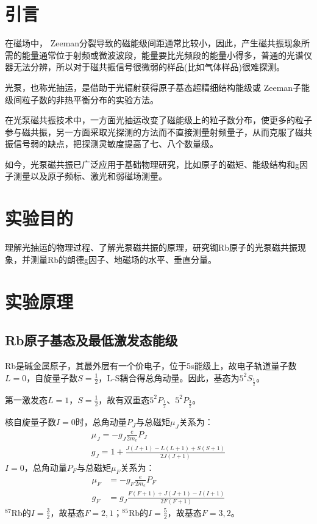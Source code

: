 \documentclass[UTF8]{ctexart}
\begin{document}
\begin{multicols}{2}
\section{引言}
在磁场中， Zeeman分裂导致的磁能级间距通常比较小，因此，产生磁共振现象所需的能量通常位于射频或微波波段，能量要比光频段的能量小得多，普通的光谱仪器无法分辨，所以对于磁共振信号很微弱的样品(比如气体样品)很难探测。

光泵，也称光抽运，是借助于光辐射获得原子基态超精细结构能级或 Zeeman子能级间粒子数的非热平衡分布的实验方法。

在光泵磁共振技术中，一方面光抽运改变了磁能级上的粒子数分布，使更多的粒子参与磁共振，另一方面采取光探测的方法而不直接测量射频量子，从而克服了磁共振信号弱的缺点，把探测灵敏度提高了七、八个数量级。

如今，光泵磁共振已广泛应用于基础物理研究，比如原子的磁矩、能级结构和g因子测量以及原子频标、激光和弱磁场测量。

\section{实验目的}
理解光抽运的物理过程、了解光泵磁共振的原理，研究铷Rb原子的光泵磁共振现象，并测量Rb的朗德g因子、地磁场的水平、垂直分量。

\section{实验原理}
\subsection{Rb原子基态及最低激发态能级}
Rb是碱金属原子，其最外层有一个价电子，位于5s能级上，故电子轨道量子数$L=0$，自旋量子数$S=\frac{1}{2}$，L-S耦合得总角动量。因此，基态为$5^2S_{\frac{1}{2}}$。

第一激发态$L=1$，$S=\frac{1}{2}$，故有双重态$5^2P_{\frac{1}{2}}$、$5^2P_{\frac{3}{2}}$。

核自旋量子数$I=0$时，总角动量$P_J$与总磁矩$\mu_J$关系为：
\begin{equation}
\begin{array}{l}{\mu_{J}=-g_{J} \frac{e}{2 m_{e}} P_{J}} \\ {g_{J}=1+\frac{J(J+1)-L(L+1)+S(S+1)}{2 J(J+1)}}\end{array}
\end{equation}
$I=0$，总角动量$P_F$与总磁矩$\mu_F$关系为：
\begin{equation}
\begin{aligned} \mu_{F} &=-g_{F} \frac{e}{2 m_{e}} P_{F} \\ g_{F} &=g_{J} \frac{F(F+1)+J(J+1)-I(I+1)}{2 F(F+1)} \end{aligned}
\end{equation}
$^{87} \mathrm{Rb}$的$I=\frac{3}{2}$，故基态$F=2,1$；$^{85} \mathrm{Rb}$的$I=\frac{5}{2}$，故基态$F=3,2$。


\end{multicols}
\end{document}
